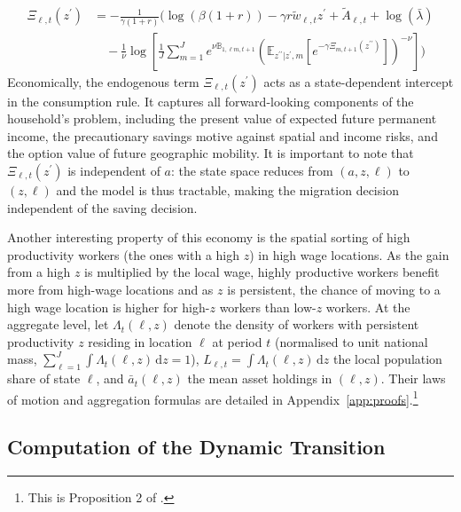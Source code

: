 \documentclass[11pt, a4paper]{article}
\begin{document}
\begin{align}
\Xi_{\ell,t}(z^\prime) &= -\frac{1}{\gamma(1+r)} \Bigg( \log(\beta(1+r)) - \gamma r \tilde{w}_{\ell,t}z^\prime + \tilde{A}_{\ell,t} + \log(\bar{\lambda}) \nonumber \\
&\quad - \frac{1}{\nu} \log \left[ \frac{1}{J} \sum_{m=1}^J e^{\nu \mathbb{B}_{1,\ell m, t+1}} \left( \mathbb{E}_{z^{\prime\prime} | z^\prime, m} \left[ e^{-\gamma \Xi_{m,t+1}(z^{\prime\prime})} \right] \right)^{-\nu} \right] \Bigg) \label{eq:Xi}
\end{align}
Economically, the endogenous term $\Xi_{\ell,t}(z^\prime)$ acts as a state-dependent intercept in the consumption rule. It captures all forward-looking components of the household's problem, including the present value of expected future permanent income, the precautionary savings motive against spatial and income risks, and the option value of future geographic mobility. It is important to note that $\Xi_{\ell,t}(z^\prime)$ is independent of $a$: the state space reduces from $(a, z, \ell)$ to $(z, \ell)$ and the model is thus tractable, making the migration decision independent of the saving decision. 

Another interesting property of this economy is the spatial sorting of high productivity workers (the ones with a high $z$) in high wage locations. As the gain from a high $z$ is multiplied by the local wage, highly productive workers benefit more from high-wage locations and as $z$ is persistent, the chance of moving to a high wage location is higher for high-$z$ workers than low-$z$ workers. At the aggregate level, let $\Lambda_t(\ell, z)$ denote the density of workers with persistent productivity $z$ residing in location $\ell$ at period $t$ (normalised to unit national mass, $\sum_{\ell=1}^J \int \Lambda_t(\ell, z)\,\mathrm{d}z = 1$), $L_{\ell,t} = \int \Lambda_t(\ell, z)\,\mathrm{d}z$ the local population share of state $\ell$, and $\bar{a}_t(\ell, z)$ the mean asset holdings in $(\ell, z)$. Their laws of motion and aggregation formulas are detailed in Appendix~\ref{app:proofs}.\footnote{This is Proposition 2 of \citet{dvorkin_geography_2025}.}

\subsection{Computation of the Dynamic Transition}
\label{sec:transition}
\end{document}
